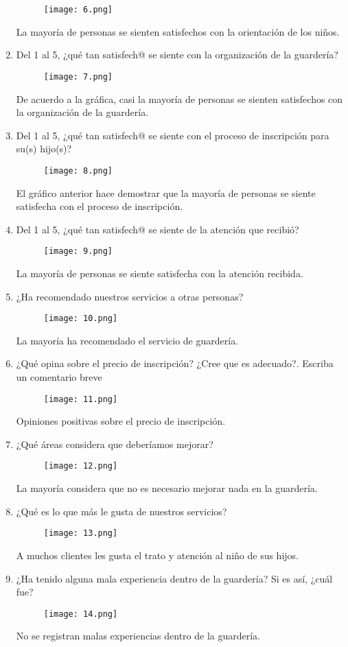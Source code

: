 \documentclass[letterpaper,12pt]{article}
\begin{document}
\begin{sloppypar}
\begin{enumerate}
  \begin{figure}[H]
    \centering 
    \texttt{[image: 6.png]}
  \end{figure}
  La mayoría de personas se sienten satisfechos con la orientación de los niños.
  \newpage
  \item Del 1 al 5, ¿qué tan satisfech@ se siente con la organización de la guardería? 
  \begin{figure}[H]
    \centering 
    \texttt{[image: 7.png]}
  \end{figure}
  De acuerdo a la gráfica, casi la mayoría de personas se sienten satisfechos con la organización de la guardería.
  \item Del 1 al 5, ¿qué tan satisfech@ se siente con el proceso de inscripción para su(s) hijo(s)? 
  \begin{figure}[H]
    \centering 
    \texttt{[image: 8.png]}
  \end{figure}
  El gráfico anterior hace demostrar que la mayoría de personas se siente satisfecha con el proceso de inscripción.
  \item Del 1 al 5, ¿qué tan satisfech@ se siente de la atención que recibió? 
  \begin{figure}[H]
    \centering 
    \texttt{[image: 9.png]}
  \end{figure}
  La mayoría de personas se siente satisfecha con la atención recibida.
  \item ¿Ha recomendado nuestros servicios a otras personas?
  \begin{figure}[H]
    \centering 
    \texttt{[image: 10.png]}
  \end{figure}
  La mayoría ha recomendado el servicio de guardería.
  \item ¿Qué opina sobre el precio de inscripción? ¿Cree que es adecuado?. Escriba un comentario breve
  \begin{figure}[H]
    \centering 
    \texttt{[image: 11.png]}
  \end{figure}
  Opiniones positivas sobre el precio de inscripción.
  \item ¿Qué áreas considera que deberíamos mejorar?
  \begin{figure}[H]
    \centering 
    \texttt{[image: 12.png]}
  \end{figure}
  La mayoría considera que no es necesario mejorar nada en la guardería.
  \item ¿Qué es lo que más le gusta de nuestros servicios?
  \begin{figure}[H]
    \centering 
    \texttt{[image: 13.png]}
  \end{figure}
  A muchos clientes les gusta el trato y atención al niño de sus hijos.
  \item ¿Ha tenido alguna mala experiencia dentro de la guardería? Si es así, ¿cuál fue?
  \begin{figure}[H]
    \centering 
    \texttt{[image: 14.png]}
  \end{figure}
  No se registran malas experiencias dentro de la guardería.
\end{enumerate}

\end{sloppypar}
\end{document}
